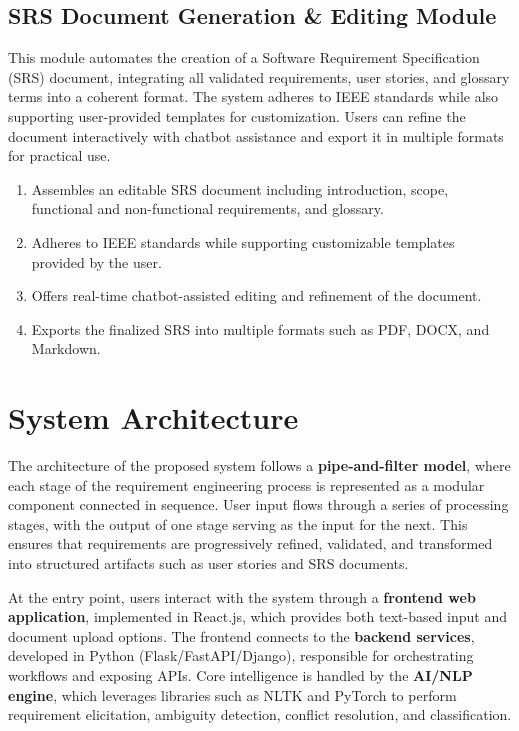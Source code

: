 \subsection{SRS Document Generation \& Editing Module}
This module automates the creation of a Software Requirement Specification (SRS) document, integrating all validated requirements, user stories, and glossary terms into a coherent format. The system adheres to IEEE standards while also supporting user-provided templates for customization. Users can refine the document interactively with chatbot assistance and export it in multiple formats for practical use.  
\begin{enumerate}
    \item Assembles an editable SRS document including introduction, scope, functional and non-functional requirements, and glossary.  
    \item Adheres to IEEE standards while supporting customizable templates provided by the user.  
    \item Offers real-time chatbot-assisted editing and refinement of the document.  
    \item Exports the finalized SRS into multiple formats such as PDF, DOCX, and Markdown.  
\end{enumerate}
\section{System Architecture}

The architecture of the proposed system follows a \textbf{pipe-and-filter model}, where each stage of the requirement engineering process is represented as a modular component connected in sequence. User input flows through a series of processing stages, with the output of one stage serving as the input for the next. This ensures that requirements are progressively refined, validated, and transformed into structured artifacts such as user stories and SRS documents.

At the entry point, users interact with the system through a \textbf{frontend web application}, implemented in React.js, which provides both text-based input and document upload options. The frontend connects to the \textbf{backend services}, developed in Python (Flask/FastAPI/Django), responsible for orchestrating workflows and exposing APIs. Core intelligence is handled by the \textbf{AI/NLP engine}, which leverages libraries such as NLTK and PyTorch to perform requirement elicitation, ambiguity detection, conflict resolution, and classification.

